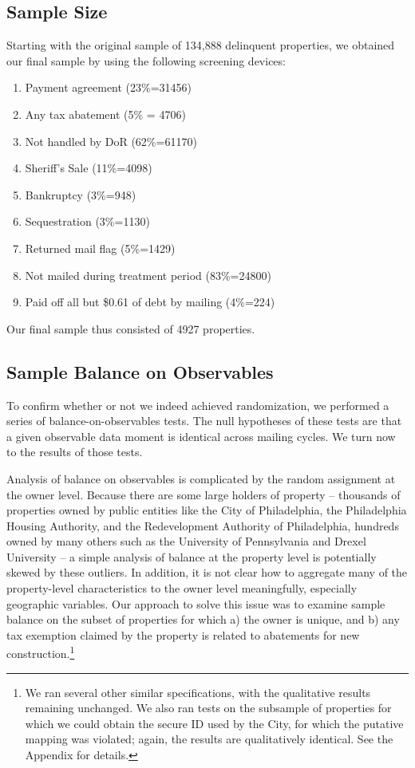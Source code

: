 \documentclass[12pt,titlepage]{article}
\begin{document}
\subsection{Sample Size}

Starting with the original sample of 134,888 delinquent properties, we
obtained our final sample by using the following screening devices:
\begin{enumerate}
\item Payment agreement (23\%=31456)
\item Any tax abatement (5\% = 4706)
\item Not handled by DoR (62\%=61170)
\item Sheriff's Sale (11\%=4098)
\item Bankruptcy (3\%=948)
\item Sequestration (3\%=1130)
\item Returned mail flag (5\%=1429)
\item Not mailed during treatment period (83\%=24800)
\item Paid off all but \$0.61 of debt by mailing (4\%=224)
\end{enumerate}
Our final sample thus consisted of 4927 properties. 


\subsection{Sample Balance on Observables}

To confirm whether or not we indeed achieved randomization, we
performed a series of balance-on-observables tests. The null
hypotheses of these tests are that a given observable data moment is
identical across mailing cycles. We turn now to the results of those
tests.

Analysis of balance on observables is complicated by the random
assignment at the owner level.  Because there are some large holders of property  -- thousands of
properties owned by public entities like the City of Philadelphia, the
Philadelphia Housing Authority, and the Redevelopment Authority of
Philadelphia, hundreds owned by many others such as the University of
Pennsylvania and Drexel University -- a simple analysis of balance at
the property level is potentially skewed by these outliers. In addition,
it is not clear how to aggregate many of the property-level
characteristics to the owner level meaningfully, especially geographic
variables. Our approach to solve this issue was to examine sample balance on the
subset of properties for which a) the owner is unique, and b) any tax exemption claimed by the property is
related to abatements for new construction.\footnote{We ran several other similar specifications, with the 
qualitative results remaining unchanged. We also ran tests on the subsample of properties for which
we could obtain the secure ID used by the City, for which the putative mapping was violated; again, the
results are qualitatively identical. See the Appendix for details.}
\end{document}
